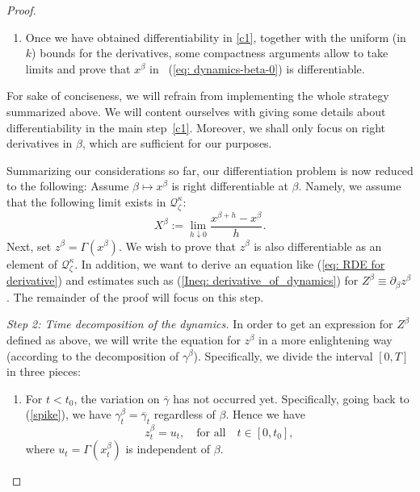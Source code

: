 \documentclass[10pt,a4paper]{amsart}
\newcommand{\ga}{\gamma}
\newcommand{\ka}{\kappa}
\begin{document}
\begin{proof}
\begin{enumerate}[wide, labelwidth=!, labelindent=0pt, label=\textnormal{(\arabic*)}]
\item\label{it:differentiability-3} 
Once we have obtained differentiability in \eqref{c1}, together with the uniform (in $k$) bounds for the derivatives, some compactness arguments allow to take limits and prove that $x^{\beta}$ in ~(\ref{eq: dynamics-beta-0}) is differentiable.
\end{enumerate}
For sake of conciseness, we will refrain from implementing the whole strategy summarized above. We will content ourselves with giving some details about differentiability in the main step~\eqref{c1}. Moreover, we shall only focus on right derivatives in $\beta$, which are sufficient for our purposes.

Summarizing our considerations so far, our differentiation problem is now reduced to the following: Assume $\beta \mapsto x^{\beta}$ is right differentiable at $\beta$. Namely, we assume that the following limit exists in $\mathcal{Q}_{\zeta}^{\kappa}$:
\begin{equation}\label{eq: Derivative of xbeta}
    X^{\beta}:=\lim_{h\downarrow 0}\frac{x^{\beta+h}-x^{\beta}}{h}.
\end{equation}
 Next, set $z^{\beta}=\Gamma(x^{\beta})$. We wish to prove that $z^{\beta}$ is also differentiable as an element of $\mathcal{Q}_{\zeta}^{\ka}$. In addition, we want to derive an equation like (\ref{eq: RDE for derivative}) and estimates such as (\ref{Ineq: derivative_of_dynamics}) for $Z^{\beta}\equiv \partial_{\beta}z^{\beta}$. The remainder of the proof will focus on this step.

\smallskip
\noindent
\textit{Step 2: Time decomposition of the dynamics.} 
In order to get an expression for $Z^{\beta}$ defined as above, we will write the equation for $z^{\beta}$ in a more enlightening way (according to the decomposition of $\gamma^{\beta}$). Specifically, we divide the interval $[0,T]$ in three  pieces:

\begin{enumerate}[wide, labelwidth=!, labelindent=0pt, label=\textnormal{(\alph*)}]
\setlength\itemsep{.05in} 

\item \label{case: t<t_{0}}
For $t<t_{0}$, the variation on $\overline{\ga}$ has not occurred yet. Specifically, going back to (\ref{spike}), we have $\gamma^{\beta}_{t}=\overline{\gamma}_{t}$ regardless of $\beta$. Hence we have 
\begin{equation}\label{eq: dynamics-equiv}
z_{t}^{\beta}={u}_{t}, 
\quad \text{for all} \quad 
t\in [0,t_{0}],
\end{equation}
where $u_{t}=\Gamma(x^{\beta}_{t})$ is independent of $\beta$.


\end{enumerate}
\end{proof}
\end{document}
